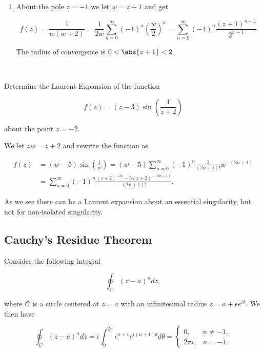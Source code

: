 \documentclass[english,a4paper,12pt]{report}
\begin{document}
{\begin{enumerate}
    \item About the pole \(z = -1\) we let \(w = z+1\) and get 
    
    \begin{equation}
        f(z) = \frac{1}{w(w+2)} = \frac{1}{2w} \sum_{n=0}^{\infty} (-1)^{n} \left(\frac{w}{2} \right)^{n} = \sum_{n=0}^{\infty} (-1)^{n} \frac{(z+1)^{n-1} }{2^{n+1} }.      
    \end{equation}

    The radius of convergence is \(0 < \abs{z+1} <2 \). 
\end{enumerate}
~
} 

{Determine the Laurent Expansion of the function 

\begin{equation}
    f(z) = (z-3) \sin \left( \frac{1}{z+2}  \right)
\end{equation}

about the point \(z=-2\).
}
{We let \(z w = z+2\) and rewrite the function as 

\begin{equation}
    \begin{aligned} 
    f(z) &=  (w-5) \sin \left( \frac{1}{w}  \right) = (w-5)  \sum_{n=0}^{\infty} (-1)^{n} \frac{1}{(2n+1)!}w^{-(2n+1)}\\
    & = \sum_{n=0}^{\infty} (-1)^{n} \frac{(z+2)^{-2n} - 5(z+2)^{-(2n+1)}  }{(2n+1)!}.      
    \end{aligned} 
\end{equation}

As we see there can be a Laurent expansion about an essential singularity, but not for non-isolated singularity.
~
} 

\subsection{Cauchy's Residue Theorem}

Consider the following integral

\begin{equation}
    \oint_{C} (z-a)^{n} dz, 
\end{equation}

where \(C\) is a circle centered at \(z = a\) with an infinitesimal radius \(z = a+\epsilon e^{i \theta } \). We then have

\begin{equation}
    \oint_{C} (z-a)^{n} dz = i \int_{0}^{2\pi } \epsilon ^{n+1} e^{i(n+1)\theta } d \theta = \begin{cases}
        0,& n \neq -1,\\
        2\pi i,& n = -1.
    \end{cases}
\end{equation}
\end{document}
